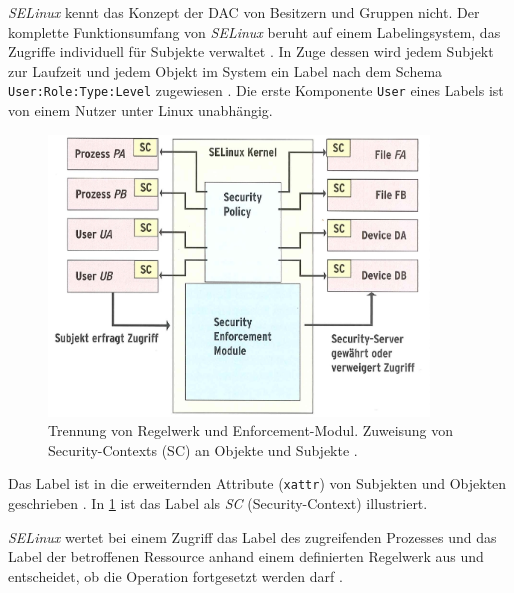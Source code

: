 \documentclass[../main.tex]{subfiles}
\begin{document}
				\emph{SELinux} kennt das Konzept der DAC von Besitzern und Gruppen nicht. Der komplette Funktionsumfang von \emph{SELinux} beruht auf einem Labelingsystem, das Zugriffe individuell für Subjekte verwaltet \cite{SELinuxComic}. In Zuge dessen wird jedem Subjekt zur Laufzeit und jedem Objekt im System ein Label nach dem Schema \texttt{User:Role:Type:Level} zugewiesen \cite{atomicDockerSELinux}. Die erste Komponente \texttt{User} eines Labels ist von einem Nutzer unter Linux unabhängig.

				\begin{figure}[h]
						\centering
						\includegraphics[width=0.9\textwidth]{./images/sec_SELinux.jpg}
						\caption{Trennung von Regelwerk und Enforcement-Modul. Zuweisung von Security-Contexts (SC) an Objekte und Subjekte \cite[S.63]{linuxMagazineSec}.}
						\label{fig:sec_SELinux}
				\end{figure}

				Das Label ist in die erweiternden Attribute (\texttt{xattr}) von Subjekten und Objekten geschrieben \cite[S.65]{linuxMagazineSec}. In \fig \ref{fig:sec_SELinux} ist das Label als \emph{SC} (Security-Context) illustriert.


				\emph{SELinux} wertet bei einem Zugriff das Label des zugreifenden Prozesses und das Label der betroffenen Ressource anhand einem definierten Regelwerk aus und entscheidet, ob die Operation fortgesetzt werden darf \cite{linuxSecOverview}.
\end{document}
